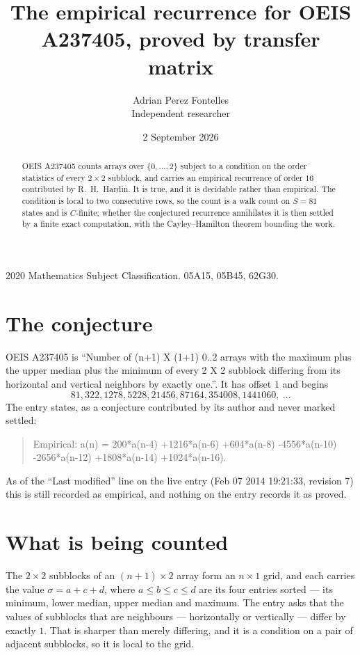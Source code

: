 \documentclass[11pt,a4paper]{article}
\title{The empirical recurrence for OEIS A237405, proved by transfer matrix}
\author{Adrian Perez Fontelles\\ \small Independent researcher}
\date{2 September 2026}
\theoremstyle{plain}
\theoremstyle{definition}
\begin{document}
\maketitle

\begin{abstract}
OEIS A237405 counts arrays over $\{0,\dots,2\}$ subject to a condition on the order
statistics of every $2\times2$ subblock, and carries an empirical recurrence of order
$16$ contributed by R.~H.~Hardin. It is true, and it is decidable rather than empirical.
The condition is local to two consecutive rows, so the count is a walk count on $S=81$
states and is $C$-finite; whether the conjectured recurrence annihilates it is then settled by
a finite exact computation, with the Cayley--Hamilton theorem bounding the work.
\end{abstract}

\noindent\small 2020 Mathematics Subject Classification. 05A15, 05B45, 62G30.\normalsize

\section{The conjecture}

OEIS A237405 is ``Number of (n+1) X (1+1) 0..2 arrays with the maximum plus the upper median plus the minimum of every 2 X 2 subblock differing from its horizontal and vertical neighbors by exactly one.''. It has offset $1$ and begins
\[
81, 322, 1278, 5228, 21456, 87164, 354008, 1441060,\ \dots
\]
The entry states, as a conjecture contributed by its author and never marked settled:
\begin{quote}
Empirical: a(n) = 200*a(n-4) +1216*a(n-6) +604*a(n-8) -4556*a(n-10) -2656*a(n-12) +1808*a(n-14) +1024*a(n-16).
\end{quote}
As of the ``Last modified'' line on the live entry (Feb 07 2014 19:21:33, revision 7) this is still
recorded as empirical, and nothing on the entry records it as proved.

\section{What is being counted}

The $2\times2$ subblocks of an $(n+1)\times2$ array form an
$n\times1$ grid, and each carries the value $\sigma=a+c+d$, where $a\le b\le c\le d$ are its four entries sorted --- its minimum, lower median, upper median and maximum. The entry asks that the values of
subblocks that are neighbours --- horizontally or vertically --- differ by exactly $1$.
That is sharper than merely differing, and it is a condition on a pair of adjacent subblocks,
so it is local to the grid.
\end{document}
